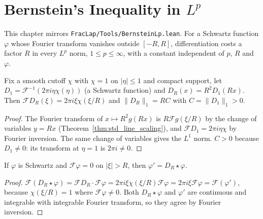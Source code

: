 \chapter{Bernstein's Inequality in $L^p$}

This chapter mirrors \texttt{FracLap/Tools/BernsteinLp.lean}. For a Schwartz function $\varphi$ whose Fourier transform vanishes outside $[-R, R]$, differentiation costs a factor $R$ in every $L^p$ norm, $1 \le p \le \infty$, with a constant independent of $p$, $R$ and $\varphi$.

\begin{lemma}\label{lem:bernstein_kernel}
\leanok
Fix a smooth cutoff $\chi$ with $\chi = 1$ on $\lvert\eta\rvert \le 1$ and compact support, let $D_1 = \mathcal{F}^{-1}(2\pi i \eta\chi(\eta))$ (a Schwartz function) and $D_R(x) = R^2 D_1(Rx)$. Then $\mathcal{F} D_R(\xi) = 2\pi i \xi \chi(\xi/R)$ and $\lVert D_R\rVert_1 = R C$ with $C = \lVert D_1\rVert_1 > 0$.
\end{lemma}

\begin{proof}
\leanok
The Fourier transform of $x \mapsto R^2 g(Rx)$ is $R \mathcal{F} g(\xi/R)$ by the change of variables $y = Rx$ (Theorem~\ref{thm:std_line_scaling}), and $\mathcal{F} D_1 = 2\pi i \eta\chi$ by Fourier inversion. The same change of variables gives the $L^1$ norm. $C > 0$ because $D_1 \ne 0$: its transform at $\eta = 1$ is $2\pi i \ne 0$.
\end{proof}

\begin{lemma}[$\varphi' = D_R \star \varphi$]\label{lem:deriv_conv}
\leanok
If $\varphi$ is Schwartz and $\mathcal{F}\varphi = 0$ on $\lvert\xi\rvert > R$, then $\varphi' = D_R \star \varphi$.
\end{lemma}

\begin{proof}
\leanok
$\mathcal{F}(D_R \star \varphi) = \mathcal{F} D_R \cdot \mathcal{F}\varphi = 2\pi i\xi\chi(\xi/R)\mathcal{F}\varphi = 2\pi i \xi \mathcal{F}\varphi = \mathcal{F}(\varphi')$, because $\chi(\xi/R) = 1$ where $\mathcal{F}\varphi \ne 0$. Both $D_R \star \varphi$ and $\varphi'$ are continuous and integrable with integrable Fourier transform, so they agree by Fourier inversion.
\end{proof}

